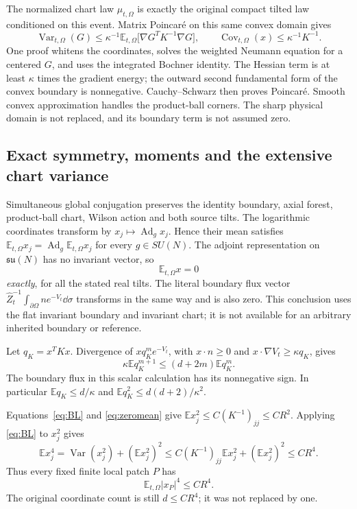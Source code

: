 \documentclass[11pt,letterpaper]{article}
\numberwithin{equation}{section}
\theoremstyle{definition}\newtheorem{definition}[theorem]{Definition}
\theoremstyle{remark}\newtheorem{remark}[theorem]{Remark}
\newcommand{\E}{\mathbb E}\newcommand{\Var}{\operatorname{Var}}
\newcommand{\Cov}{\operatorname{Cov}}\newcommand{\Tr}{\operatorname{Tr}}
\newcommand{\Ad}{\operatorname{Ad}}
\begin{document}
The normalized chart law $\mu_{t,\Omega}$ is exactly the original compact tilted law conditioned on this event. Matrix Poincar\'e on this same convex domain gives
\begin{equation}
 \Var_{t,\Omega}(G)\le\kappa^{-1}
 \E_{t,\Omega}\bigl[\nabla G^TK^{-1}\nabla G\bigr],
 \qquad \Cov_{t,\Omega}(x)\le\kappa^{-1}K^{-1}.
 \label{eq:BL}
\end{equation}
One proof whitens the coordinates, solves the weighted Neumann equation for a centered $G$, and uses the integrated Bochner identity. The Hessian term is at least $\kappa$ times the gradient energy; the outward second fundamental form of the convex boundary is nonnegative. Cauchy--Schwarz then proves Poincar\'e. Smooth convex approximation handles the product-ball corners. The sharp physical domain is not replaced, and its boundary term is not assumed zero.

\subsection{Exact symmetry, moments and the extensive chart variance}

Simultaneous global conjugation preserves the identity boundary, axial forest, product-ball chart, Wilson action and both source tilts. The logarithmic coordinates transform by $x_j\mapsto\Ad_gx_j$. Hence their mean satisfies
$\E_{t,\Omega}x_j=\Ad_g\E_{t,\Omega}x_j$ for every $g\in SU(N)$. The adjoint representation on $\mathfrak{su}(N)$ has no invariant vector, so
\begin{equation}
 \E_{t,\Omega}x=0
 \label{eq:zeromean}
\end{equation}
\emph{exactly}, for all the stated real tilts. The literal boundary flux vector
$\widehat Z_t^{-1}\int_{\partial\Omega}n e^{-V_t}\dd\sigma$
transforms in the same way and is also zero. This conclusion uses the flat invariant boundary and invariant chart; it is not available for an arbitrary inherited boundary or reference.

Let $q_K=x^TKx$. Divergence of $xq_K^m e^{-V_t}$, with $x\cdot n\ge0$ and
$x\cdot\nabla V_t\ge\kappa q_K$, gives
\begin{equation}
 \kappa\E q_K^{m+1}\le(d+2m)\E q_K^m.
 \label{eq:radialmoments}
\end{equation}
The boundary flux in this scalar calculation has its nonnegative sign. In particular $\E q_K\le d/\kappa$ and $\E q_K^2\le d(d+2)/\kappa^2$.

Equations~\eqref{eq:BL} and \eqref{eq:zeromean} give
$\E x_j^2\le C(K^{-1})_{jj}\le CR^2$. Applying \eqref{eq:BL} to $x_j^2$ gives
\[
 \E x_j^4=\Var(x_j^2)+(\E x_j^2)^2
 \le C(K^{-1})_{jj}\E x_j^2+(\E x_j^2)^2\le CR^4.
\]
Thus every fixed finite local patch $P$ has
\begin{equation}
 \E_{t,\Omega}|x_P|^4\le CR^4.
 \label{eq:localfourth}
\end{equation}
The original coordinate count is still $d\le CR^4$; it was not replaced by one.
\end{document}
